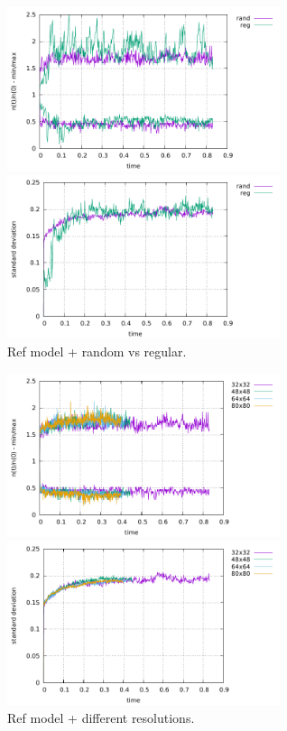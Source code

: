 \begin{center}
\includegraphics[width=8cm]{python_codes/fieldstone_30/results_streamline/markercount_reg}
\includegraphics[width=8cm]{python_codes/fieldstone_30/results_streamline/stdev_reg}\\
{\captionfont Ref model + random vs regular.} 
\end{center}

\begin{center}
\includegraphics[width=8cm]{python_codes/fieldstone_30/results_streamline/markercount_res}
\includegraphics[width=8cm]{python_codes/fieldstone_30/results_streamline/stdev_res}\\
{\captionfont Ref model + different resolutions.}
\end{center}

